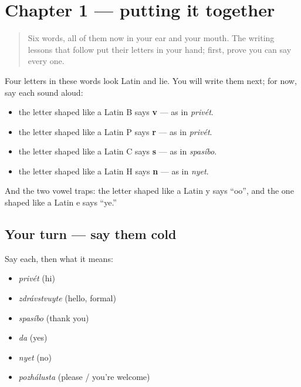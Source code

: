 \section[Practice]{Chapter 1 — putting it together}

\label{lesson:RU-C01-practice}



\begin{quote}
Six words, all of them now in your ear and your mouth. The writing lessons that follow put their letters in your hand; first, prove you can say every one.
\end{quote}

\begin{sounds}
Four letters in these words look Latin and lie. You will write them next; for now, say each sound aloud:

\begin{itemize}
\raggedright
  \item the letter shaped like a Latin B says \textbf{v} — as in \emph{privét}.
  \item the letter shaped like a Latin P says \textbf{r} — as in \emph{privét}.
  \item the letter shaped like a Latin C says \textbf{s} — as in \emph{spasíbo}.
  \item the letter shaped like a Latin H says \textbf{n} — as in \emph{nyet}.
\end{itemize}

And the two vowel traps: the letter shaped like a Latin y says \textquotedblleft{}oo\textquotedblright{}, and the one shaped like a Latin e says \textquotedblleft{}ye.\textquotedblright{}
\end{sounds}

\subsection*{Your turn — say them cold}
Say each, then what it means:

\begin{itemize}
\raggedright
  \item \emph{privét} (hi)
  \item \emph{zdrávstvuyte} (hello, formal)
  \item \emph{spasíbo} (thank you)
  \item \emph{da} (yes)
  \item \emph{nyet} (no)
  \item \emph{pozhálusta} (please / you're welcome)
\end{itemize}

